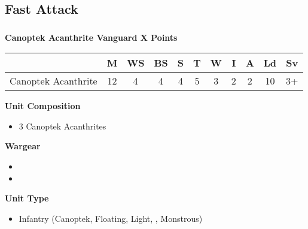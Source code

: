 \subsection{Fast Attack}


\newpage
\subsubsection[Canoptek Acanthrite Vanguard]{}
\hspace{0.5em}
\begin{minipage}[t]{0.72\textwidth}
	{\large \textbf{Canoptek Acanthrite Vanguard \dotfill X Points}}
	
	\begin{tabular}{m{165 pt} *{10}{c}}
		& M & WS & BS & S & T & W & I & A & Ld & Sv \\
		\hline
		Canoptek Acanthrite & 12 & 4 & 4 & 4 & 5 & 3 & 2 & 2 & 10 & 3+ \\
	\end{tabular}
	\small
	\begin{minipage}[t]{0.5\textwidth}
		\begin{flushleft}
			\vspace*{2em}
			\textbf{Unit Composition}
			\begin{itemize}
				\item 3 Canoptek Acanthrites
			\end{itemize}
			
			\textbf{Wargear}
			\begin{itemize}
				\item {}
				\item {}
			\end{itemize}
		\end{flushleft}
	\end{minipage}
	\begin{minipage}[t]{0.5\textwidth}
		\begin{flushleft}
			\vspace*{2em}
			\textbf{Unit Type}
			\begin{itemize}
				\item Infantry (Canoptek, Floating, Light, , Monstrous)
			\end{itemize}
			

\end{flushleft}
\end{minipage}
\end{minipage}
